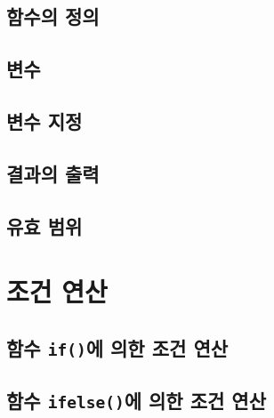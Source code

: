 \documentclass[
]{book}
\begin{document}
\hypertarget{uxd568uxc218uxc758-uxc815uxc758}{%
\subsection{함수의 정의}\label{uxd568uxc218uxc758-uxc815uxc758}}

\hypertarget{uxbcc0uxc218}{%
\subsection{변수}\label{uxbcc0uxc218}}

\hypertarget{uxbcc0uxc218-uxc9c0uxc815}{%
\subsection{변수 지정}\label{uxbcc0uxc218-uxc9c0uxc815}}

\hypertarget{uxacb0uxacfcuxc758-uxcd9cuxb825}{%
\subsection{결과의 출력}\label{uxacb0uxacfcuxc758-uxcd9cuxb825}}

\hypertarget{uxc720uxd6a8-uxbc94uxc704}{%
\subsection{유효 범위}\label{uxc720uxd6a8-uxbc94uxc704}}

\hypertarget{uxc870uxac74-uxc5f0uxc0b0}{%
\section{조건 연산}\label{uxc870uxac74-uxc5f0uxc0b0}}

\hypertarget{uxd568uxc218-ifuxc5d0-uxc758uxd55c-uxc870uxac74-uxc5f0uxc0b0}{%
\subsection{\texorpdfstring{함수 \texttt{if()}에 의한 조건 연산}{함수 if()에 의한 조건 연산}}\label{uxd568uxc218-ifuxc5d0-uxc758uxd55c-uxc870uxac74-uxc5f0uxc0b0}}

\hypertarget{uxd568uxc218-ifelseuxc5d0-uxc758uxd55c-uxc870uxac74-uxc5f0uxc0b0}{%
\subsection{\texorpdfstring{함수 \texttt{ifelse()}에 의한 조건 연산}{함수 ifelse()에 의한 조건 연산}}\label{uxd568uxc218-ifelseuxc5d0-uxc758uxd55c-uxc870uxac74-uxc5f0uxc0b0}}
\end{document}
